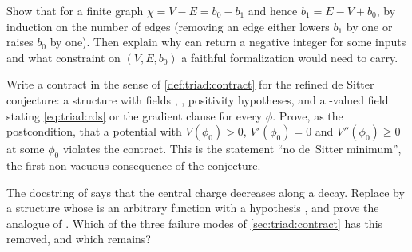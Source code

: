 \begin{exercise}[$\star\star$]
Show that for a finite graph $\chi=V-E=b_0-b_1$ and hence $b_1=E-V+b_0$, by induction on the
number of edges (removing an edge either lowers $b_1$ by one or raises $b_0$ by one). Then
explain why  can return a negative integer for some inputs
and what constraint on $(V,E,b_0)$ a faithful formalization would need to carry.
\end{exercise}

\begin{exercise}[$\star\star\star$]
Write a contract in the sense of \cref{def:triad:contract} for the refined de Sitter
conjecture: a structure with fields , , positivity hypotheses,
and a -valued field stating \eqref{eq:triad:rds} or the gradient clause for every
$\phi$. Prove, as the postcondition, that a potential with $V(\phi_0)>0$, $V'(\phi_0)=0$ and
$V''(\phi_0)\ge0$ at some $\phi_0$ violates the contract. This is the statement ``no
de~Sitter minimum'', the first non-vacuous consequence of the conjecture.
\end{exercise}

\begin{exercise}[$\star\star\star$]
The docstring of  says that the central charge decreases along a
decay. Replace  by a structure whose  is an
arbitrary function  with a hypothesis , and prove the
analogue of . Which of the three failure modes of
\cref{sec:triad:contract} has this removed, and which remains?
\end{exercise}

